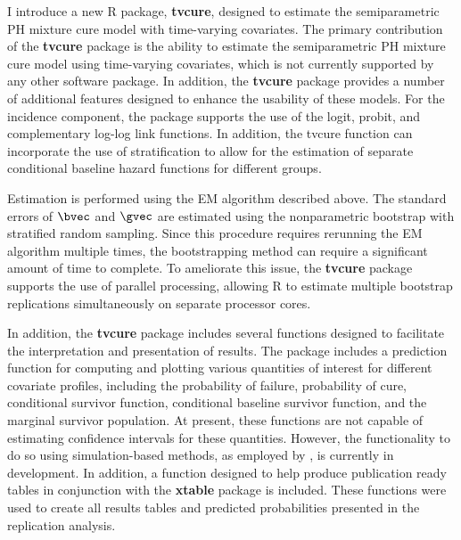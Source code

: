 I introduce a new R package, \textbf{tvcure}, designed to estimate the semiparametric PH mixture cure model with time-varying covariates. The primary contribution of the \textbf{tvcure} package is the ability to estimate the semiparametric PH mixture cure model using time-varying covariates, which is not currently supported by any other software package. In addition, the \textbf{tvcure} package provides a number of additional features designed to enhance the usability of these models.
	For the incidence component, the package supports the use of the logit, probit, and complementary log-log link functions. %
	In addition, the tvcure function can incorporate the use of stratification to allow for the estimation of separate conditional baseline hazard functions for different groups. 

Estimation is performed using the EM algorithm described above. The standard errors of $\bvec$ and $\gvec$ are estimated using the nonparametric bootstrap with stratified random sampling. 
Since this procedure requires rerunning the EM algorithm multiple times, the bootstrapping method can require a significant amount of time to complete. To ameliorate this issue, the \textbf{tvcure} package supports the use of parallel processing, allowing R to estimate multiple bootstrap replications simultaneously on separate processor cores. 

In addition, the \textbf{tvcure} package includes several functions designed to facilitate the interpretation and presentation of results. The package includes a prediction function for computing and plotting various quantities of interest for different covariate profiles, including the probability of failure, probability of cure, conditional survivor function, conditional baseline survivor function, and the marginal survivor population. At present, these functions are not capable of estimating confidence intervals for these quantities. However, the functionality to do so using simulation-based methods, as employed by \citet{beger2017}, is currently in development. In addition, a function designed to help produce publication ready tables in conjunction with the \textbf{xtable} package is included. These functions were used to create all results tables and predicted probabilities presented in the replication analysis.


